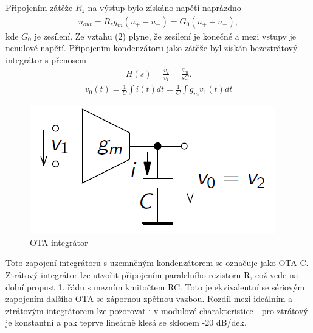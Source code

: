 \documentclass[twoside]{article}
\begin{document}
\noindent Připojením zátěže $R_z$ na výstup bylo získáno napětí naprázdno
\begin{align}
u_{out} = R_zg_m(u_+ - u_-) = G_0(u_+ - u_-),
\end{align}
kde $G_0$ je zesílení. Ze vztahu (2) plyne, že zesílení je konečné a mezi vstupy je nenulové napětí. Připojením kondenzátoru jako zátěže byl získán bezeztrátový integrátor s přenosem
\begin{align}
H(s) = \frac{v_2}{v_1} = \frac{g_m}{sC}.
\end{align}
\begin{align}
v_0(t) = \frac{1}{C}\int i(t)dt = \frac{1}{C}\int g_mv_1(t)dt
\end{align}
\begin{figure}[H]
\centering
\includegraphics[scale=0.5]{otaintegrator.png}
\caption{OTA integrátor \cite{3}}
\end{figure}
Toto zapojení integrátoru s uzemněným kondenzátorem se označuje jako OTA-C. Ztrátový integrátor lze utvořit připojením paralelního rezistoru R, což vede na dolní propust 1. řádu s mezním kmitočtem RC. Toto je ekvivalentní se sériovým zapojením dalšího OTA se zápornou zpětnou vazbou. Rozdíl mezi ideálním a ztrátovým integrátorem lze pozorovat i v modulové charakteristice - pro ztrátový je konstantní a pak teprve lineárně klesá se sklonem -20 dB/dek.
\end{document}
